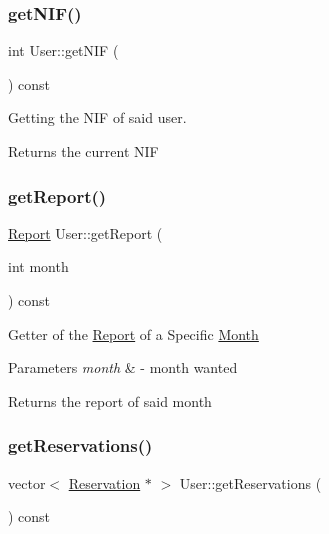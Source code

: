 \subsubsection{\texorpdfstring{get\+N\+I\+F()}{getNIF()}}
{\footnotesize\ttfamily int User\+::get\+N\+IF (\begin{DoxyParamCaption}{ }\end{DoxyParamCaption}) const}



Getting the N\+IF of said user. 

\begin{DoxyReturn}{Returns}
the current N\+IF 
\end{DoxyReturn}
\mbox{\label{class_user_a655a16e4a6e044d973b54073cdb4bc96}} 
\subsubsection{\texorpdfstring{get\+Report()}{getReport()}}
{\footnotesize\ttfamily \mbox{\hyperlink{class_report}{Report}} User\+::get\+Report (\begin{DoxyParamCaption}\item[{int}]{month }\end{DoxyParamCaption}) const}

Getter of the \mbox{\hyperlink{class_report}{Report}} of a Specific \mbox{\hyperlink{class_month}{Month}} 
\begin{DoxyParams}{Parameters}
{\em month} & -\/ month wanted \\
\hline
\end{DoxyParams}
\begin{DoxyReturn}{Returns}
the report of said month 
\end{DoxyReturn}
\mbox{\label{class_user_a52c283b101a310a3be644bb9f8552f34}} 
\subsubsection{\texorpdfstring{get\+Reservations()}{getReservations()}}
{\footnotesize\ttfamily vector$<$ \mbox{\hyperlink{class_reservation}{Reservation}} $\ast$ $>$ User\+::get\+Reservations (\begin{DoxyParamCaption}{ }\end{DoxyParamCaption}) const}



